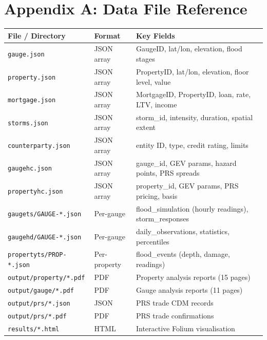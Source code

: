 \documentclass[11pt,a4paper]{article}
\begin{document}
\clearpage
\section*{Appendix A: Data File Reference}

\begin{longtable}{@{}lll@{}}
    \toprule
    \textbf{File / Directory} & \textbf{Format} & \textbf{Key Fields} \\
    \midrule
    \endhead
    \texttt{gauge.json}           & JSON array & GaugeID, lat/lon, elevation, flood stages \\
    \texttt{property.json}        & JSON array & PropertyID, lat/lon, elevation, floor level, value \\
    \texttt{mortgage.json}        & JSON array & MortgageID, PropertyID, loan, rate, LTV, income \\
    \texttt{storms.json}          & JSON array & storm\_id, intensity, duration, spatial extent \\
    \texttt{counterparty.json}    & JSON array & entity ID, type, credit rating, limits \\
    \texttt{gaugehc.json}         & JSON array & gauge\_id, GEV params, hazard points, PRS spreads \\
    \texttt{propertyhc.json}      & JSON array & property\_id, GEV params, PRS pricing, basis \\
    \midrule
    \texttt{gaugets/GAUGE-*.json} & Per-gauge  & flood\_simulation (hourly readings), storm\_responses \\
    \texttt{gaugehd/GAUGE-*.json} & Per-gauge  & daily\_observations, statistics, percentiles \\
    \texttt{propertyts/PROP-*.json}& Per-property & flood\_events (depth, damage, readings) \\
    \midrule
    \texttt{output/property/*.pdf} & PDF & Property analysis reports (15 pages) \\
    \texttt{output/gauge/*.pdf}    & PDF & Gauge analysis reports (11 pages) \\
    \texttt{output/prs/*.json}     & JSON & PRS trade CDM records \\
    \texttt{output/prs/*.pdf}      & PDF & PRS trade confirmations \\
    \texttt{results/*.html}        & HTML & Interactive Folium visualisation \\
    \bottomrule
\end{longtable}

\end{document}

